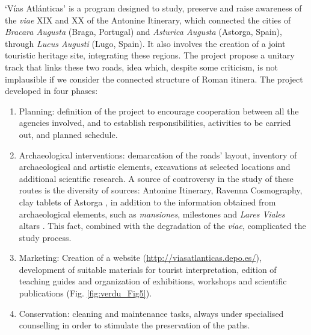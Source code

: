 ‘Vías Atlánticas’  is a program designed to study, preserve and raise awareness of the \textit{viae} XIX and XX of the Antonine Itinerary, which connected the cities of \textit{Bracara Augusta} (Braga, Portugal) and \textit{Asturica Augusta} (Astorga, Spain), through \textit{Lucus Augusti} (Lugo, Spain). It also involves the creation of a joint touristic heritage site, integrating these regions. The project propose a unitary track that links these two roads, idea which, despite some criticism, is not implausible if we consider the connected structure of Roman itinera.
The project developed in four phases: 
\begin{enumerate}
	\item Planning: definition of the project to encourage cooperation between all the agencies involved, and to establish responsibilities, activities to be carried out, and planned schedule.
	\item Archaeological interventions: demarcation of the roads’ layout, inventory of archaeological and artistic elements, excavations at selected locations and additional scientific research. A source of controversy in the study of these routes is the diversity of sources: Antonine Itinerary, Ravenna Cosmography, clay tablets of Astorga \parencites[149]{Mendez_1996}[22--30]{Rodriguez_2004}, in addition to the information obtained from archaeological elements, such as \textit{mansiones}, milestones and \textit{Lares Viales} altars \parencite{Rodriguez_2004}. This fact, combined with the degradation of the \textit{viae}, complicated the study process.
	\item Marketing: Creation of a website (\url{http://viasatlanticas.depo.es/}), development of suitable materials for tourist interpretation, edition of teaching guides and organization of exhibitions, workshops and scientific publications (Fig. \ref{fig:verdu_Fig5}).
	\item Conservation: cleaning and maintenance tasks, always under specialised counselling in order to stimulate the preservation of the paths. 
\end{enumerate}

